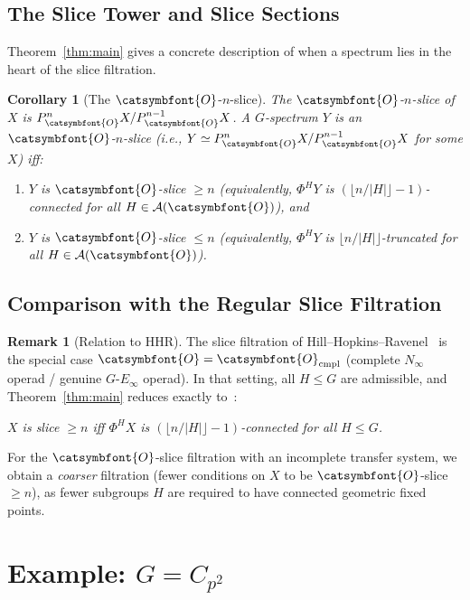 \documentclass[12pt]{article}
\newcommand{\aO}{{\catsymbfont{O}}}
\newtheorem{corollary}[theorem]{Corollary}
\theoremstyle{definition}
\newtheorem{remark}[theorem]{Remark}
\begin{document}
\subsection{The Slice Tower and Slice Sections}

Theorem~\ref{thm:main} gives a concrete description of when a spectrum lies in the heart of the slice filtration.

\begin{corollary}[The $\aO$-$n$-slice]\label{cor:n-slice}
The \emph{$\aO$-$n$-slice} of $X$ is $P^n_\aO X / P^{n-1}_\aO X$.  A $G$-spectrum $Y$ is an $\aO$-$n$-slice (i.e., $Y\simeq P^n_\aO X/P^{n-1}_\aO X$ for some $X$) iff:
\begin{enumerate}[label=(\alph*)]
   \item $Y$ is $\aO$-slice $\geq n$ (equivalently, $\Phi^H Y$ is $(\lfloor n/|H|\rfloor - 1)$-connected for all $H\in\mathcal{A}(\aO)$), and
   \item $Y$ is $\aO$-slice $\leq n$ (equivalently, $\Phi^H Y$ is $\lfloor n/|H|\rfloor$-truncated for all $H\in\mathcal{A}(\aO)$).
\end{enumerate}
\end{corollary}

\subsection{Comparison with the Regular Slice Filtration}

\begin{remark}[Relation to HHR]
The slice filtration of Hill--Hopkins--Ravenel~\cite{HHR} is the special case $\aO = \aO_{\mathrm{cmpl}}$ (complete $N_\infty$ operad / genuine $G$-$E_\infty$ operad).  In that setting, all $H\leq G$ are admissible, and Theorem~\ref{thm:main} reduces exactly to~\cite[Prop.~4.28]{HHR}:

\begin{center}\emph{$X$ is slice $\geq n$ iff $\Phi^H X$ is $(\lfloor n/|H|\rfloor - 1)$-connected for all $H\leq G$.}\end{center}

For the $\aO$-slice filtration with an incomplete transfer system, we obtain a \emph{coarser} filtration (fewer conditions on $X$ to be $\aO$-slice $\geq n$), as fewer subgroups $H$ are required to have connected geometric fixed points.
\end{remark}

\section{Example: $G = C_{p^2}$}
\end{document}
